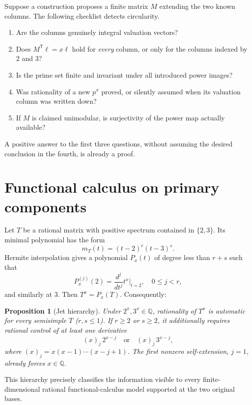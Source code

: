 \documentclass[11pt,oneside]{article}
\newtheorem{proposition}[theorem]{Proposition}
\theoremstyle{definition}
\theoremstyle{remark}
\newcommand{\Q}{\mathbb Q}
\begin{document}
Suppose a construction proposes a finite matrix \(M\) extending the two
known columns.  The following checklist detects circularity.

\begin{enumerate}
\item Are the columns genuinely integral valuation vectors?
\item Does \(M^{\mathsf T}\ell=x\ell\) hold for \emph{every} column, or
      only for the columns indexed by \(2\) and \(3\)?
\item Is the prime set finite and invariant under all introduced power
      images?
\item Was rationality of a new \(p^x\) proved, or silently assumed when
      its valuation column was written down?
\item If \(M\) is claimed unimodular, is surjectivity of the power map
      actually available?
\end{enumerate}

A positive answer to the first three questions, without assuming the
desired conclusion in the fourth, is already a proof.

\section{Functional calculus on primary components}

Let \(T\) be a rational matrix with positive spectrum contained in
\(\{2,3\}\).  Its minimal polynomial has the form
\[
        m_T(t)=(t-2)^r(t-3)^s.
\]
Hermite interpolation gives a polynomial \(P_x(t)\) of degree
less than \(r+s\) such that
\[
 P_x^{(j)}(2)=\frac{d^j}{dt^j}t^x\bigg|_{t=2},
 \quad 0\leq j<r,
\]
and similarly at \(3\).  Then \(T^x=P_x(T)\).  Consequently:

\begin{proposition}[Jet hierarchy]\label{prop:jet-hierarchy}
Under \(2^x,3^x\in\Q\), rationality of \(T^x\) is automatic for every
semisimple \(T\) (\(r,s\leq1\)).  If \(r\geq2\) or \(s\geq2\), it
additionally requires rational control of at least one derivative
\[
        (x)_j\,2^{x-j}
        \quad\text{or}\quad
        (x)_j\,3^{x-j},
\]
where \((x)_j=x(x-1)\cdots(x-j+1)\).
The first nonzero self-extension, \(j=1\), already forces \(x\in\Q\).
\end{proposition}

This hierarchy precisely classifies the information visible to every
finite-dimensional rational functional-calculus model supported at the
two original bases.
\end{document}
